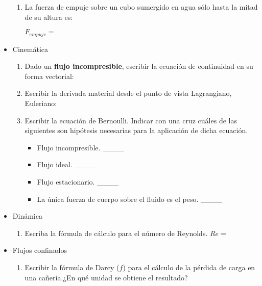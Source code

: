 \begin{itemize}
\begin{enumerate}
    \item La fuerza de empuje sobre un cubo sumergido en agua sólo hasta la mitad de su altura es:

    $F_{empuje} =$ 


    \end{enumerate}
    
    \clearpage
    
   \item Cinemática
    \begin{enumerate}
    \item Dado un {\bf flujo incompresible}, escribir la ecuación de continuidad en su forma vectorial: 
    \item Escribir la derivada material desde el punto de vista Lagrangiano, Euleriano:\\
    
    \item Escribir la ecuación de Bernoulli. Indicar con una cruz cuáles de las siguientes son hipótesis
    necesarias para la aplicación de dicha ecuación.


      \begin{itemize}
      \item Flujo incompresible. \_\_\_\_
      \item Flujo ideal. \_\_\_\_
      \item Flujo estacionario. \_\_\_\_
      \item La única fuerza de cuerpo sobre el fluido es el peso. \_\_\_\_
      \end{itemize}

    \end{enumerate}
    
   \item Dinámica
    \begin{enumerate}
        \item Escriba la fórmula de cálculo para el número de Reynolds. $Re = $

    \end{enumerate}
    
   \item Flujos confinados
    \begin{enumerate}
    \item Escribir la fórmula de Darcy ($f$) para el cálculo de la pérdida de carga en una cañería.¿En qué unidad se obtiene el resultado?



\end{enumerate}
\end{itemize}
